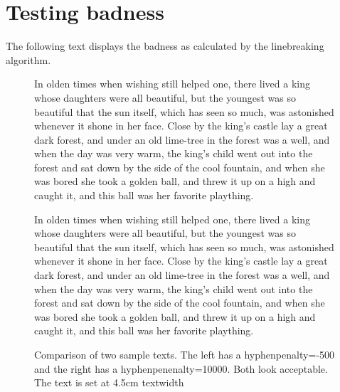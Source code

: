 {{\section{Testing badness}
The following text displays the badness as calculated by the linebreaking algorithm.
\begin{figure*}[htb]
\fussy
{} 
\begin{minipage}[t]{4.5cm}
\mbox{}
\trypar{}
In olden times when wishing
still helped one, there lived a
king whose daughters were all
beautiful, but the youngest was so
beautiful that the sun itself,
which has seen so much, was
astonished whenever it shone in
her face. Close by the king's
castle lay a great dark forest,
and under an old lime-tree in the
forest was a well, and when
the day was very warm, the
king's child went out into the 
forest and sat down by the side
of the cool fountain, and when she was bored she
took a golden ball, and threw it up on a high and caught it, and this
ball was her favorite plaything. \par
\end{minipage}
\hspace{2cm}
\begin{minipage}[t]{4.5cm}
\mbox{}
\trypar{}
In olden times when wishing
still helped one, there lived a
king whose daughters were all
beautiful, but the youngest was so
beautiful that the sun itself,
which has seen so much, was
astonished whenever it shone in
her face. Close by the king's
castle lay a great dark forest,
and under an old lime-tree in the
forest was a well, and when
the day was very warm, the
king's child went out into the 
forest and sat down by the side
of the cool fountain, and when she was bored she
took a golden ball, and threw it up on a high and caught it, and this
ball was her favorite plaything. \par
\end{minipage}
\caption{Comparison of two sample texts. The left has a hyphenpenalty=-500 and the right has a hyphenpenenalty=10000. Both look acceptable. The text is set at 4.5cm textwidth}
\end{figure*}

}}
